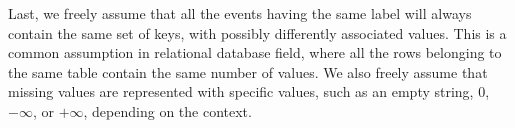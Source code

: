 Last, we freely assume that all the events having the same label will always contain the same set of keys, with possibly differently associated values. This is a common assumption in relational database field, where all the rows belonging to the same table contain the same number of values. We also freely assume that missing values are represented with specific values, such as an empty string, $0$, $-\infty$, or $+\infty$, depending on the context.